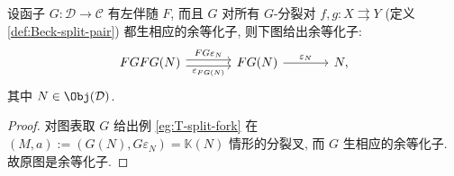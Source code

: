 \begin{lemma}\label{prop:Beck-FG-coeq}
	设函子 $G: \mathcal{D} \to \mathcal{C}$ 有左伴随 $F$, 而且 $G$ 对所有 $G$-分裂对 $f, g: X \rightrightarrows Y$ (定义 \ref{def:Beck-split-pair}) 都生相应的余等化子, 则下图给出余等化子:
	\begin{equation*}\begin{tikzcd}[column sep=large]
		FGFG(N) \arrow[shift left, r, "FG\varepsilon_N"] \arrow[shift right, r, "\varepsilon_{FG(N)}"'] & FG(N) \arrow[r, "\varepsilon_N"] & N,
	\end{tikzcd}\end{equation*}
	其中 $N \in \Obj(\mathcal{D})$.
\end{lemma}
\begin{proof}
	对图表取 $G$ 给出例 \ref{eg:T-split-fork} 在 $(M, a) := (G(N), G\varepsilon_N) = \mathbb{K}(N)$ 情形的分裂叉, 而 $G$ 生相应的余等化子. 故原图是余等化子.
\end{proof}
